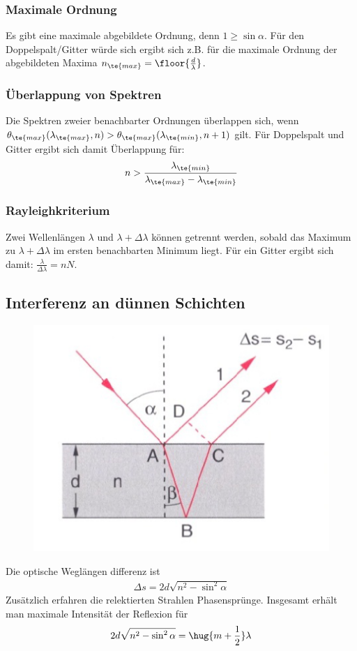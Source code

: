 \documentclass[twocolumn, unnumberedsubsub]{summery_5.0} %
\begin{document}
\subsubsection{Maximale Ordnung}
Es gibt eine maximale abgebildete Ordnung, denn \(1\ge\sin\alpha\). Für den Doppelspalt/Gitter würde sich ergibt sich z.B. für die maximale Ordnung der abgebildeten Maxima
\(n_{\te{max}}= \floor{\frac d\lambda}\).

\subsubsection{Überlappung von Spektren}
Die Spektren zweier benachbarter Ordnungen überlappen sich, wenn 
\(\theta_{\te{max}}(\lambda_{\te{max}}, n) > \theta_{\te{max}}(\lambda_{\te{min}}, n+1)\) gilt.
Für Doppelspalt und Gitter ergibt sich damit Überlappung für:
\begin{align*}
    n > \frac{\lambda_{\te{min}}}{\lambda_{\te{max}} - \lambda_{\te{min}}}
\end{align*}



\subsubsection{Rayleighkriterium}
Zwei Wellenlängen \(\lambda\) und \(\lambda + \Delta \lambda\) können getrennt werden, sobald das Maximum 
zu \(\lambda + \Delta \lambda\) im ersten benachbarten Minimum liegt.
Für ein Gitter ergibt sich damit: \(\frac{\lambda}{\Delta \lambda} = n N\).

\subsection{Interferenz an dünnen Schichten}
\begin{figure}[H]
    \centering
    \includegraphics[width=.3\textwidth]{InteferenzAnSchichten.png}
\end{figure}
Die optische Weglängen differenz ist 
\begin{align*}
    {\Delta s = 2d \sqrt{n^2 -\sin^2\alpha}}
\end{align*}
Zusätzlich erfahren die relektierten Strahlen Phasensprünge.
Insgesamt erhält man maximale Intensität der Reflexion für
\begin{align*}
    2d\sqrt{n^2 - \sin^2\alpha} =\hug{m+\frac12} \lambda
\end{align*}
\end{document}
